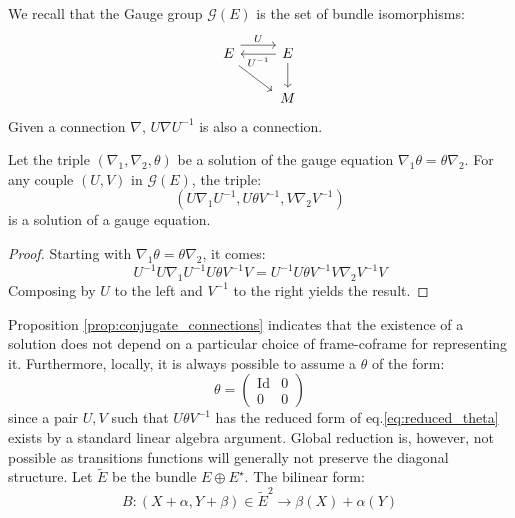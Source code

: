 We recall that the Gauge group $\mathcal{G}(E)$ is the set of bundle isomorphisms: 
\begin{equation}
    \label{eq:gauge_group}
    \begin{tikzcd}
    E \ar[r,shift left = 1.5ex, "U"] \ar[rd, shift right=0.5ex] & E \ar[l,"U^{-1}"] \ar[d] \\
    & M
    \end{tikzcd}
\end{equation}
Given a connection $\nabla$, $U \nabla U^{-1}$ is also a connection.
\begin{prop}
\label{prop:conjugate_connections}
Let the triple $\left(\nabla_1, \nabla_2,\theta \right)$ be a solution of the gauge equation $\nabla_1 \theta = \theta \nabla_2.$ 
For any couple $(U,V)$ in $\mathcal{G}(E)$, the triple:
\[
\left( U \nabla_1 U^{-1}, U \theta V^{-1}, V \nabla_2 V^{-1} \right)
\]
is a solution of a gauge equation.
\end{prop}
\begin{proof}
Starting with $\nabla_1 \theta = \theta \nabla_2$, it comes:
\begin{equation}
U^{-1} U \nabla_1 U^{-1} U \theta V^{-1} V = U^{-1} U \theta V^{-1} V \nabla_2 V^{-1} V 
\end{equation}
Composing by $U$ to the left and $V^{-1}$ to the right yields the result.
\end{proof}
Proposition \ref{prop:conjugate_connections} indicates that the existence of a solution does not depend on a particular choice of frame-coframe for representing it. Furthermore, locally, it is always possible to assume a $\theta$ of the form:
\begin{equation}
    \label{eq:reduced_theta}
    \theta = \left( \begin{array}{c|c} \text{Id} & 0 \\ \hline
    0 & 0
    \end{array} \right)
\end{equation}since a pair $U,V$ such that $U \theta V^{-1}$ has the reduced form of eq.\ref{eq:reduced_theta} exists by a standard linear algebra argument. Global reduction is, however, not possible as transitions functions will generally not preserve the diagonal structure.
 Let $\tilde{E}$ be the bundle $E \oplus E^\star$. The bilinear form:
 \begin{equation}
     \label{eq:bilinear_etilde}
     B \colon \left(
     X+\alpha,Y+\beta
     \right) \in \tilde{E}^2 \to \beta(X)+\alpha(Y)
 \end{equation}
